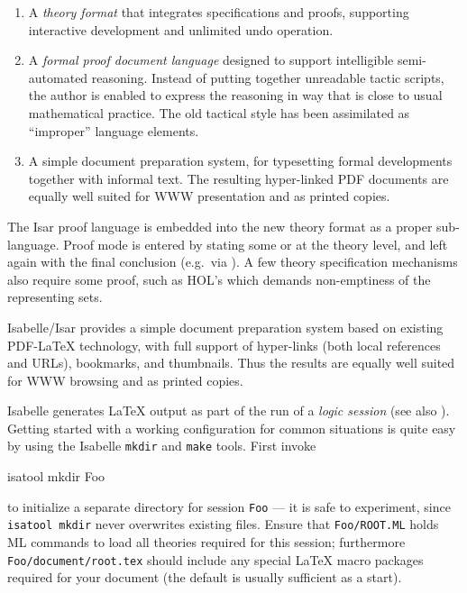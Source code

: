 \begin{isabellebody}
\begin{isamarkuptext}
  \begin{enumerate}
  
  \item A \emph{theory format} that integrates specifications and
  proofs, supporting interactive development and unlimited undo
  operation.
  
  \item A \emph{formal proof document language} designed to support
  intelligible semi-automated reasoning.  Instead of putting together
  unreadable tactic scripts, the author is enabled to express the
  reasoning in way that is close to usual mathematical practice.  The
  old tactical style has been assimilated as ``improper'' language
  elements.
  
  \item A simple document preparation system, for typesetting formal
  developments together with informal text.  The resulting
  hyper-linked PDF documents are equally well suited for WWW
  presentation and as printed copies.

  \end{enumerate}

  The Isar proof language is embedded into the new theory format as a
  proper sub-language.  Proof mode is entered by stating some
  \mbox{} or \mbox{} at the theory level, and
  left again with the final conclusion (e.g.\ via \mbox{}).
  A few theory specification mechanisms also require some proof, such
  as HOL's \mbox{} which demands non-emptiness of the
  representing sets.%
\end{isamarkuptext}%
\isamarkuptrue%
%
\isamarkuptrue%
%
\begin{isamarkuptext}%
Isabelle/Isar provides a simple document preparation system based on
  existing {PDF-\LaTeX} technology, with full support of hyper-links
  (both local references and URLs), bookmarks, and thumbnails.  Thus
  the results are equally well suited for WWW browsing and as printed
  copies.

  \medskip

  Isabelle generates {\LaTeX} output as part of the run of a
  \emph{logic session} (see also \cite{isabelle-sys}).  Getting
  started with a working configuration for common situations is quite
  easy by using the Isabelle \verb|mkdir| and \verb|make|
  tools.  First invoke
\begin{ttbox}
  isatool mkdir Foo
\end{ttbox}
  to initialize a separate directory for session \verb|Foo| ---
  it is safe to experiment, since \texttt{isatool mkdir} never
  overwrites existing files.  Ensure that \verb|Foo/ROOT.ML|
  holds ML commands to load all theories required for this session;
  furthermore \verb|Foo/document/root.tex| should include any
  special {\LaTeX} macro packages required for your document (the
  default is usually sufficient as a start).


\end{isamarkuptext}
\end{isabellebody}
